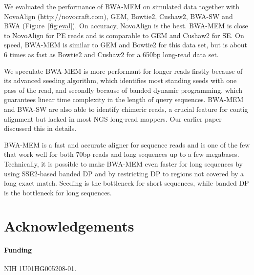 \documentclass{bioinfo}
\begin{document}
We evaluated the performance of BWA-MEM on simulated data together with
NovoAlign (http://novocraft.com), GEM, Bowtie2, Cushaw2, BWA-SW and BWA
(Figure~\ref{fig:eval}). On accuracy, NovoAlign is the best. BWA-MEM is close
to NovoAlign for PE reads and is comparable to GEM and Cushaw2 for SE.  On
speed, BWA-MEM is similar to GEM and Bowtie2 for this data set, but is about
6 times as fast as Bowtie2 and Cushaw2 for a 650bp long-read data set.

We speculate BWA-MEM is more performant for longer reads firstly because of its
advanced seeding algorithm, which identifies most standing seeds with one pass
of the read, and secondly because of banded dynamic programming, which
guarantees linear time complexity in the length of query sequences. BWA-MEM and
BWA-SW are also able to identify chimeric reads, a crucial feature for contig
alignment but lacked in most NGS long-read mappers. Our earlier
paper~\citep{Li:2010fk} discussed this in details.


BWA-MEM is a fast and accurate aligner for sequence reads and is one of the few
that work well for both 70bp reads and long sequences up to a few megabases.
Technically, it is possible to make BWA-MEM even faster for long sequences by
using SSE2-based banded DP and by restricting DP to regions not covered by a
long exact match. Seeding is the bottleneck for short sequences, while banded
DP is the bottleneck for long sequences.

\section{Acknowledgements}
\paragraph{Funding\textcolon} NIH 1U01HG005208-01.

\end{document}
